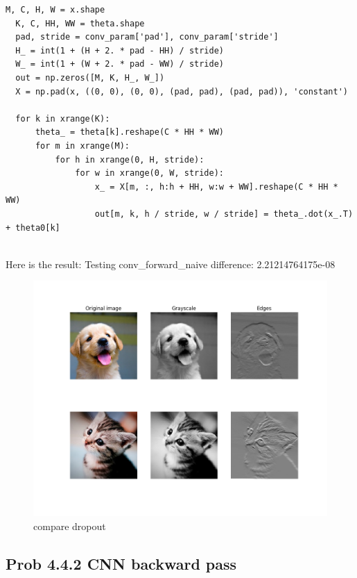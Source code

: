 \documentclass[12pt]{article}
\begin{document}
\begin{lstlisting}
M, C, H, W = x.shape
  K, C, HH, WW = theta.shape
  pad, stride = conv_param['pad'], conv_param['stride']
  H_ = int(1 + (H + 2. * pad - HH) / stride)
  W_ = int(1 + (W + 2. * pad - WW) / stride)
  out = np.zeros([M, K, H_, W_])
  X = np.pad(x, ((0, 0), (0, 0), (pad, pad), (pad, pad)), 'constant')

  for k in xrange(K):
      theta_ = theta[k].reshape(C * HH * WW)
      for m in xrange(M):
          for h in xrange(0, H, stride):
              for w in xrange(0, W, stride):
                  x_ = X[m, :, h:h + HH, w:w + WW].reshape(C * HH * WW)
                  out[m, k, h / stride, w / stride] = theta_.dot(x_.T) + theta0[k]
  
\end{lstlisting}
Here is the result:
Testing conv\_forward\_naive
difference:  2.21214764175e-08
\begin{figure}[H]
  \caption{compare dropout}
  \centering
    \includegraphics[scale=0.5]{dog.png}
\end{figure}


\subsection*{Prob 4.4.2 CNN backward pass}
\end{document}
